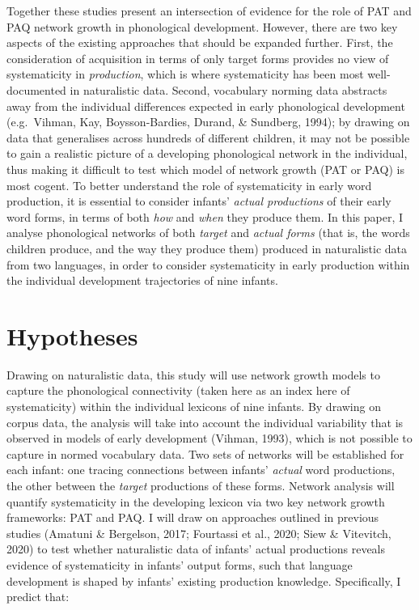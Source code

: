 \documentclass[
  english,
  man,floatsintext]{apa6}
\begin{document}
Together these studies present an intersection of evidence for the role of PAT and PAQ network growth in phonological development. However, there are two key aspects of the existing approaches that should be expanded further. First, the consideration of acquisition in terms of only target forms provides no view of systematicity in \emph{production}, which is where systematicity has been most well-documented in naturalistic data. Second, vocabulary norming data abstracts away from the individual differences expected in early phonological development (e.g.~Vihman, Kay, Boysson-Bardies, Durand, \& Sundberg, 1994); by drawing on data that generalises across hundreds of different children, it may not be possible to gain a realistic picture of a developing phonological network in the individual, thus making it difficult to test which model of network growth (PAT or PAQ) is most cogent. To better understand the role of systematicity in early word production, it is essential to consider infants' \emph{actual productions} of their early word forms, in terms of both \emph{how} and \emph{when} they produce them. In this paper, I analyse phonological networks of both \emph{target} and \emph{actual forms} (that is, the words children produce, and the way they produce them) produced in naturalistic data from two languages, in order to consider systematicity in early production within the individual development trajectories of nine infants.

\hypertarget{hypotheses}{%
\section{Hypotheses}\label{hypotheses}}

Drawing on naturalistic data, this study will use network growth models to capture the phonological connectivity (taken here as an index here of systematicity) within the individual lexicons of nine infants. By drawing on corpus data, the analysis will take into account the individual variability that is observed in models of early development (Vihman, 1993), which is not possible to capture in normed vocabulary data. Two sets of networks will be established for each infant: one tracing connections between infants' \emph{actual} word productions, the other between the \emph{target} productions of these forms. Network analysis will quantify systematicity in the developing lexicon via two key network growth frameworks: PAT and PAQ. I will draw on approaches outlined in previous studies (Amatuni \& Bergelson, 2017; Fourtassi et al., 2020; Siew \& Vitevitch, 2020) to test whether naturalistic data of infants' actual productions reveals evidence of systematicity in infants' output forms, such that language development is shaped by infants' existing production knowledge. Specifically, I predict that:
\end{document}
